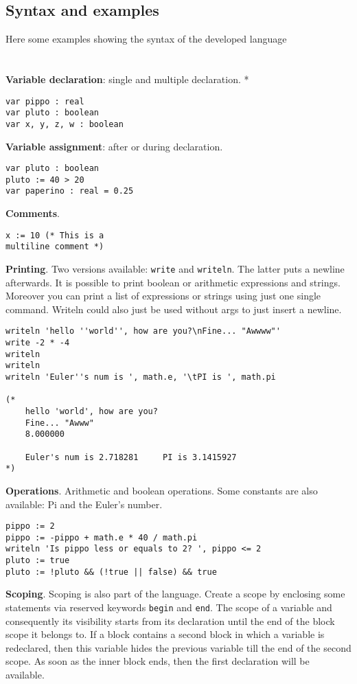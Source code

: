 \documentclass[12pt]{article}
\begin{document}
\subsection{Syntax and examples}
Here some examples showing the syntax of the developed language\\\\\\
\textbf{Variable declaration}: single and multiple declaration. *
\begin{lstlisting}[frame=single]
var pippo : real
var pluto : boolean
var x, y, z, w : boolean
\end{lstlisting}
\pagebreak
\textbf{Variable assignment}: after or during declaration.
\begin{lstlisting}[frame=single]
var pluto : boolean
pluto := 40 > 20
var paperino : real = 0.25
\end{lstlisting}
\vspace{1.8cm}
\textbf{Comments}.
\begin{lstlisting}[frame=single]
x := 10 (* This is a
multiline comment *)
\end{lstlisting}
\vspace{1.8cm}
\textbf{Printing}. Two versions available: \texttt{write} and \texttt{writeln}. The latter puts a newline afterwards. It is possible to print boolean or arithmetic expressions and strings. Moreover you can print a list of expressions or strings using just one single command. Writeln could also just be used without args to just insert a newline.
\vspace{0.1cm}
\begin{lstlisting}[frame=single]
writeln	'hello ''world'', how are you?\nFine... "Awwww"'
write -2 * -4
writeln
writeln
writeln 'Euler''s num is ', math.e, '\tPI is ', math.pi

(*
	hello 'world', how are you?
	Fine... "Awww"
	8.000000
	
	Euler's num is 2.718281     PI is 3.1415927
*)
\end{lstlisting}
\vspace{2cm}
\textbf{Operations}. Arithmetic and boolean operations. Some constants are also available: Pi and the Euler's number.
\begin{lstlisting}[frame=single]
pippo := 2
pippo := -pippo + math.e * 40 / math.pi
writeln 'Is pippo less or equals to 2? ', pippo <= 2 
pluto := true
pluto := !pluto && (!true || false) && true
\end{lstlisting}
\vspace{2cm}
\textbf{Scoping}. Scoping is also part of the language. Create a scope by enclosing some statements via reserved keywords \texttt{begin} and \texttt{end}. The scope of a variable and consequently its visibility starts from its declaration until the end of the block scope it belongs to. If a block contains a second block in which a variable is redeclared, then this variable hides the previous variable till the end of the second scope. As soon as the inner block ends, then the first declaration will be available.
\end{document}
